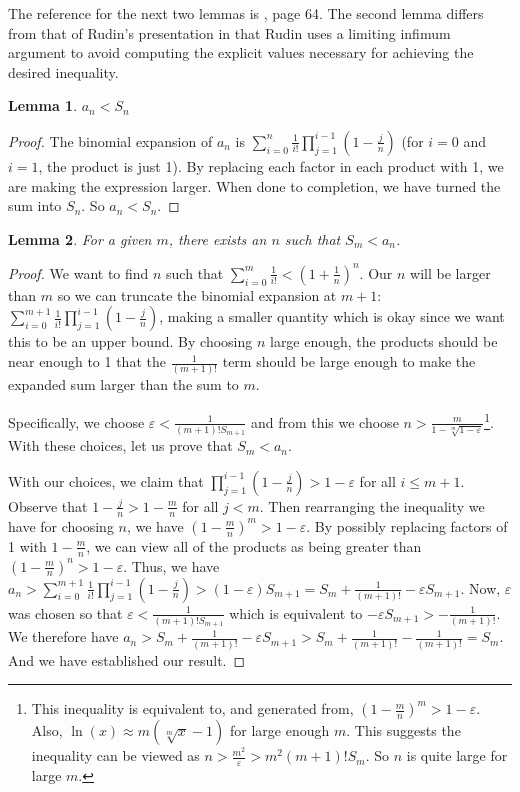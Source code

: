 \documentclass[12pt]{article}
\newtheorem{lemma}{Lemma}
\theoremstyle{remark}
\begin{document}
The reference for the next two lemmas is \cite{rudin}, page 64. The second lemma differs from that of Rudin's presentation in that Rudin uses a limiting infimum argument to avoid computing the explicit values necessary for achieving the desired inequality. 

\begin{lemma}
$a_n < S_n$
\end{lemma}

\begin{proof}
The binomial expansion of $a_n$ is $\sum_{i=0}^n \frac{1}{i!} \prod_{j=1}^{i-1} (1-\tfrac{j}{n})$ (for $i=0$ and $i=1$, the product is just 1). By replacing each factor in each product with 1, we are making the expression larger. When done to completion, we have turned the sum into $S_n$. So $a_n < S_n$.
\end{proof}

\begin{lemma}
For a given $m$, there exists an $n$ such that $S_m < a_n$.   
\end{lemma}

\begin{proof}
 We want to find $n$ such that $\sum_{i=0}^m \frac{1}{i!} < (1+\frac{1}{n})^n$. Our $n$ will be larger than $m$ so we can truncate the binomial expansion at $m+1$: $\sum_{i=0}^{m+1} \frac{1}{i!} \prod_{j=1}^{i-1} (1-\tfrac{j}{n})$, making a smaller quantity which is okay since we want this to be an upper bound. By choosing $n$ large enough, the products should be near enough to 1 that the $\frac{1}{(m+1)!}$ term should be large enough to make the expanded sum larger than the sum to $m$. 

 Specifically, we choose $\varepsilon < \frac{1}{(m+1)! S_{m+1}  }$ and from this we choose $n > \frac{m}{ 1 - \sqrt[m]{1-\varepsilon}}$\footnote{This inequality is equivalent to, and generated from, $(1-\tfrac{m}{n})^m > 1 - \varepsilon$. Also, $\ln(x) \approx m (\sqrt[m]{x} -1)$ for large enough $m$. This suggests the inequality can be viewed as $n >\frac{m^2}{\varepsilon} > m^2 (m+1)! S_m$. So $n$ is quite large for large $m$.}. With these choices, let us prove that $S_m < a_n$. 
 
 With our choices, we claim that $\prod_{j=1}^{i-1} (1-\tfrac{j}{n}) > 1-\varepsilon$ for all $i \leq m+1$. Observe that $1-\tfrac{j}{n} > 1 -\tfrac{m}{n}$ for all $j < m$. Then rearranging the inequality we have for choosing $n$, we have $(1 - \tfrac{m}{n})^m > 1 - \varepsilon $. By possibly replacing factors of 1 with $1-\tfrac{m}{n}$, we can view all of the products as being greater than $(1 - \tfrac{m}{n})^n > 1-\varepsilon$.  Thus, we have 
 $a_n >  \sum_{i=0}^{m+1} \frac{1}{i!} \prod_{j=1}^{i-1} (1-\tfrac{j}{n}) > (1-\varepsilon) S_{m+1} = S_m + \frac{1}{(m+1)!} - \varepsilon S_{m+1}$.  Now, $\varepsilon$ was chosen so that $\varepsilon < \frac{1}{(m+1)! S_{m+1}}$ which is equivalent to $- \varepsilon S_{m+1} > -\frac{1}{(m+1)!}$. We therefore have $a_n > S_m + \frac{1}{(m+1)!} - \varepsilon S_{m+1} > S_m + \frac{1}{(m+1)!} - \frac{1}{(m+1)!} = S_m$. And we have established our result. 
\end{proof}
\end{document}
